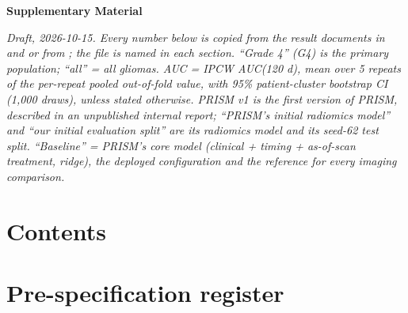 \documentclass[11pt,a4paper]{article}
\begin{document}
\linenumbers

\begin{flushleft}
{\Large\bfseries Supplementary Material\par}
\vspace{0.8em}
{\large\bfseries \papertitle\par}
\end{flushleft}

\emph{Draft, 2026-10-15. Every number below is copied from the result documents in
 and
 or from
; the file is named in each section.
``Grade 4'' (G4)
is the primary population; ``all'' = all gliomas. AUC = IPCW AUC(120 d), mean over 5 repeats of the per-repeat
pooled out-of-fold value, with 95\% patient-cluster bootstrap CI (1,000 draws), unless stated otherwise.
PRISM v1 is the first version of PRISM, described in an unpublished internal report; ``PRISM's initial radiomics
model'' and ``our initial evaluation split'' are its radiomics model and its seed-62 test split. ``Baseline'' =
PRISM's core model (clinical + timing + as-of-scan treatment, ridge), the deployed configuration and the reference
for every imaging comparison.}

\section*{Contents}
\makeatletter{}\makeatother

\FloatBarrier
\section{Pre-specification register}\label{sec:S1}
\end{document}
